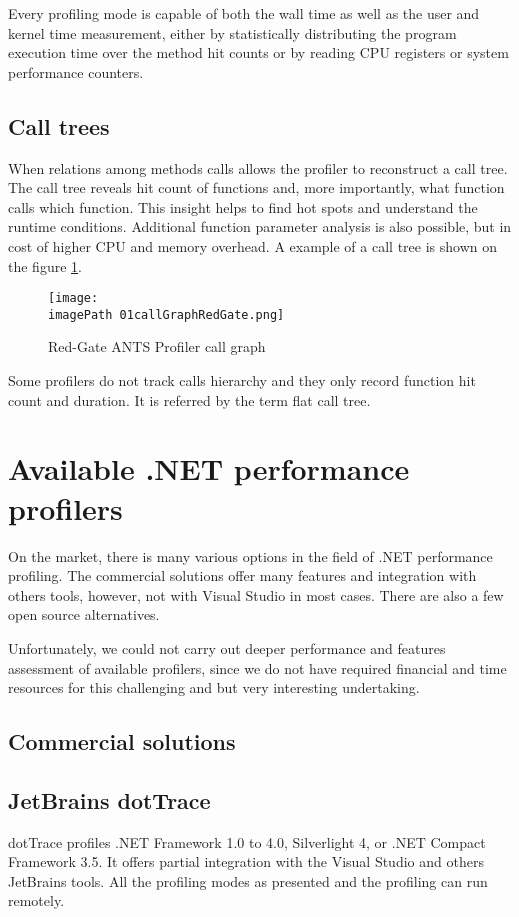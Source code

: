 Every profiling mode is capable of both the wall time as well as the user and kernel time measurement, either by statistically distributing the program execution time over the method hit counts or by reading CPU registers or system performance counters.

\subsection{Call trees}
When relations among methods calls allows the profiler to reconstruct a call tree. The call tree reveals hit count of functions and, more importantly, what function calls which function. This insight helps to find hot spots and understand the runtime conditions.
Additional function parameter analysis is also possible, but in cost of higher CPU and memory overhead. A example of a call tree is shown on the figure \ref{fig:01callGraphRedGate}.

\begin{figure}
	\centering
		\texttt{[image: \\imagePath 01callGraphRedGate.png]}
		\caption{Red-Gate ANTS Profiler call graph}
	\label{fig:01callGraphRedGate}
\end{figure}

Some profilers do not track calls hierarchy and they only record function hit count and duration. It is referred by the term flat call tree.

\section{Available .NET performance profilers}
On the market, there is many various options in the field of .NET performance profiling. The commercial solutions offer many features and integration with others tools, however, not with Visual Studio in most cases. There are also a few open source alternatives.

Unfortunately, we could not carry out deeper performance and features assessment of available profilers, since we do not have required financial and time resources for this challenging and but very interesting undertaking.

\subsection*{Commercial solutions}

\subsection{JetBrains dotTrace}
dotTrace profiles .NET Framework 1.0 to 4.0, Silverlight 4, or .NET Compact Framework 3.5. It offers partial integration with the Visual Studio and others JetBrains tools. All the profiling modes as presented and the profiling can run remotely.

